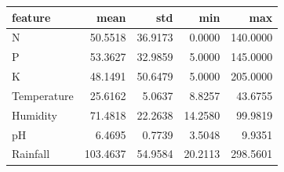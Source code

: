 \begin{tabular}{lrrrr}
\toprule
feature & mean & std & min & max \\
\midrule
N & 50.5518 & 36.9173 & 0.0000 & 140.0000 \\
P & 53.3627 & 32.9859 & 5.0000 & 145.0000 \\
K & 48.1491 & 50.6479 & 5.0000 & 205.0000 \\
Temperature & 25.6162 & 5.0637 & 8.8257 & 43.6755 \\
Humidity & 71.4818 & 22.2638 & 14.2580 & 99.9819 \\
pH & 6.4695 & 0.7739 & 3.5048 & 9.9351 \\
Rainfall & 103.4637 & 54.9584 & 20.2113 & 298.5601 \\
\bottomrule
\end{tabular}
